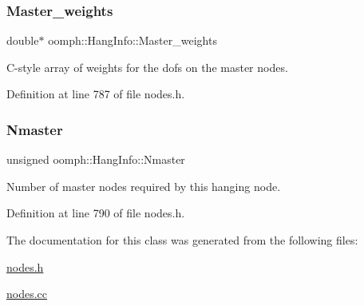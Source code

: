 \mbox{\label{classoomph_1_1HangInfo_ac9edb46a1890f19fb4dfc02c652cd398}} 
\subsubsection{\texorpdfstring{Master\+\_\+weights}{Master\_weights}}
{\footnotesize\ttfamily double$\ast$ oomph\+::\+Hang\+Info\+::\+Master\+\_\+weights\hspace{0.3cm}{\ttfamily [private]}}



C-\/style array of weights for the dofs on the master nodes. 



Definition at line 787 of file nodes.\+h.

\mbox{\label{classoomph_1_1HangInfo_a9e256dac82251e6167bd7a763fe4e134}} 
\subsubsection{\texorpdfstring{Nmaster}{Nmaster}}
{\footnotesize\ttfamily unsigned oomph\+::\+Hang\+Info\+::\+Nmaster\hspace{0.3cm}{\ttfamily [private]}}



Number of master nodes required by this hanging node. 



Definition at line 790 of file nodes.\+h.



The documentation for this class was generated from the following files\+:\begin{DoxyCompactItemize}
\item 
\hyperlink{nodes_8h}{nodes.\+h}\item 
\hyperlink{nodes_8cc}{nodes.\+cc}\end{DoxyCompactItemize}
